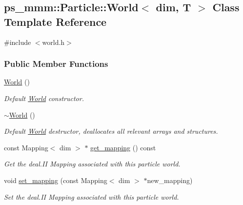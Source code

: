 \hypertarget{classps__mmm_1_1_particle_1_1_world}{}\subsection{ps\+\_\+mmm\+:\+:Particle\+:\+:World$<$ dim, T $>$ Class Template Reference}
\label{classps__mmm_1_1_particle_1_1_world}


{\ttfamily \#include $<$world.\+h$>$}

\subsubsection*{Public Member Functions}
\begin{DoxyCompactItemize}
\item 
\hyperlink{classps__mmm_1_1_particle_1_1_world_a81dc003d0de8d71028a80bf27ff651e6}{World} ()
\begin{DoxyCompactList}\small\item\em Default \hyperlink{classps__mmm_1_1_particle_1_1_world}{World} constructor. \end{DoxyCompactList}\item 
\hyperlink{classps__mmm_1_1_particle_1_1_world_a3bad0dbb53eebc492f4f778083d79a97}{$\sim$\+World} ()
\begin{DoxyCompactList}\small\item\em Default \hyperlink{classps__mmm_1_1_particle_1_1_world}{World} destructor, deallocates all relevant arrays and structures. \end{DoxyCompactList}\item 
const Mapping$<$ dim $>$ $\ast$ \hyperlink{classps__mmm_1_1_particle_1_1_world_a01a471e7660f9a740216567d9f476b08}{get\+\_\+mapping} () const 
\begin{DoxyCompactList}\small\item\em Get the deal.\+I\+I Mapping associated with this particle world. \end{DoxyCompactList}\item 
void \hyperlink{classps__mmm_1_1_particle_1_1_world_a774c564058f9242522ccb57c5a78ab0e}{set\+\_\+mapping} (const Mapping$<$ dim $>$ $\ast$new\+\_\+mapping)
\begin{DoxyCompactList}\small\item\em Set the deal.\+I\+I Mapping associated with this particle world. \end{DoxyCompactList}\item 

\end{DoxyCompactItemize}
